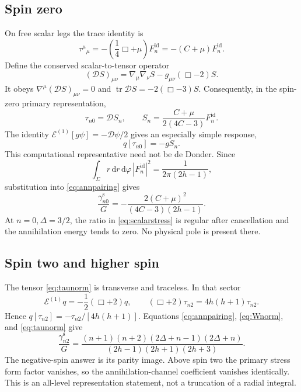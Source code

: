 \documentclass[11pt,a4paper]{article}
\numberwithin{equation}{section}
\theoremstyle{remark}\newtheorem{remark}[theorem]{Remark}
\newcommand{\dd}{\mathrm d}
\newcommand{\tr}{\operatorname{tr}}
\begin{document}
\subsection{Spin zero}

On free scalar legs the trace identity is
\begin{equation}
 \tau^\mu{}_{\mu}=-\left(\frac14\Box+\mu\right)F_n^{\mathrm{id}}
 =-(C+\mu)F_n^{\mathrm{id}}.
\end{equation}
Define the conserved scalar-to-tensor operator
\begin{equation}
 (\mathscr D S)_{\mu\nu}=
 \nabla_\mu\nabla_\nu S-g_{\mu\nu}(\Box-2)S.
\end{equation}
It obeys $\nabla^\mu(\mathscr D S)_{\mu\nu}=0$ and
$\tr\mathscr D S=-2(\Box-3)S$. Consequently, in the spin-zero primary representation,
\begin{equation}
 \tau_{n0}=\mathscr D S_n,\qquad
 S_n=\frac{C+\mu}{2(4C-3)}F_n^{\mathrm{id}}.
 \label{eq:scalarstress}
\end{equation}
The identity $\mathcal E^{(1)}[g\psi]=-\mathscr D\psi/2$ gives an especially simple response,
\begin{equation}
 q[\tau_{n0}]=-gS_n.
\end{equation}
This computational representative need not be de Donder. Since
\begin{equation}
 \int_\Sigma r\,\dd r\,\dd\varphi\,|F_n^{\mathrm{id}}|^2
 =\frac1{2\pi(2h-1)},
\end{equation}
substitution into \eqref{eq:annpairing} gives
\begin{equation}
 \frac{\gamma^{\mathrm s}_{n0}}G
 =-\frac{2(C+\mu)^2}{(4C-3)(2h-1)}.
\end{equation}
At $n=0,\Delta=3/2$, the ratio in \eqref{eq:scalarstress} is regular after cancellation and the annihilation energy tends to zero. No physical pole is present there.

\subsection{Spin two and higher spin}

The tensor \eqref{eq:taunorm} is transverse and traceless. In that sector
\begin{equation}
 \mathcal E^{(1)}q=-\frac12(\Box+2)q,\qquad
 (\Box+2)\tau_{n2}=4h(h+1)\tau_{n2}.
\end{equation}
Hence $q[\tau_{n2}]=-\tau_{n2}/[4h(h+1)]$. Equations \eqref{eq:annpairing}, \eqref{eq:Wnorm}, and \eqref{eq:taunorm} give
\begin{equation}
 \frac{\gamma^{\mathrm s}_{n2}}G
 =\frac{(n+1)(n+2)(2\Delta+n-1)(2\Delta+n)}
 {(2h-1)(2h+1)(2h+3)}.
\end{equation}
The negative-spin answer is its parity image. Above spin two the primary stress form factor vanishes, so the annihilation-channel coefficient vanishes identically. This is an all-level representation statement, not a truncation of a radial integral.
\end{document}
